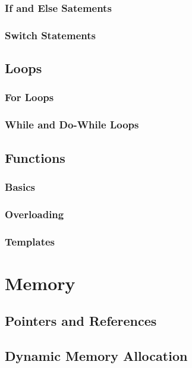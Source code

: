 \documentclass[11pt,fancy,authoryear]{elegantbook}
\begin{document}
\subsection{If and Else Satements}

\subsection{Switch Statements}

\section{Loops}

\subsection{For Loops}

\subsection{While and Do-While Loops}

\section{Functions}

\subsection{Basics}

\subsection{Overloading}

\subsection{Templates}

\chapter{Memory}

\section{Pointers and References}

\section{Dynamic Memory Allocation}
\end{document}
